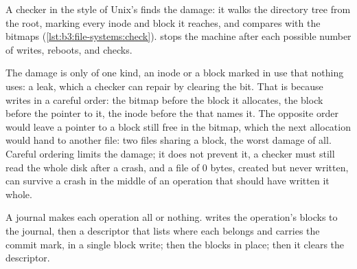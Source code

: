 A checker in the style of Unix's  finds the damage: it walks the directory tree from the root, marking every inode and block it reaches, and compares with the bitmaps (\cref{lst:b3:file-systems:check}).  stops the machine after each possible number of writes, reboots, and checks.

\label{lst:b3:file-systems:check}

\label{lst:b3:file-systems:crash}

\label{out:b3:file-systems:crash}

The damage is only of one kind, an inode or a block marked in use that nothing uses: a leak, which a checker can repair by clearing the bit. That is because  writes in a careful order: the bitmap before the block it allocates, the block before the pointer to it, the inode before the  that names it. The opposite order would leave a pointer to a block still free in the bitmap, which the next allocation would hand to another file: two files sharing a block, the worst damage of all. Careful ordering limits the damage; it does not prevent it, a checker must still read the whole disk after a crash, and a file of 0 bytes, created but never written, can survive a crash in the middle of an operation that should have written it whole.

A journal makes each operation all or nothing.  writes the operation's blocks to the journal, then a descriptor that lists where each belongs and carries the commit mark, in a single block write; then the blocks in place; then it clears the descriptor.

\label{lst:b3:file-systems:commit}

